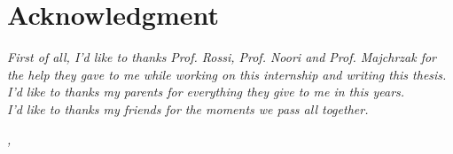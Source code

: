 \documentclass[../thesis.tex]{subfiles}
\begin{document}
    \cleardoublepage

    \bigskip

    \begingroup
    \let\clearpage\relax
    \let\cleardoublepage\relax
    \let\cleardoublepage\relax

    \chapter*{Acknowledgment}
    \noindent \textit{First of all, I'd like to thanks Prof. Rossi, Prof. Noori and Prof. Majchrzak for the help they gave to me while working on this internship and writing this thesis.}\\

    \noindent \textit{I'd like to thanks my parents for everything they give to me in this years.}\\

    \noindent \textit{I'd like to thanks my friends for the moments we pass all together.}\\
    \bigskip

    \noindent\textit{\myLocation, \myTime}
    \hfill \myName

    \endgroup
\end{document}

